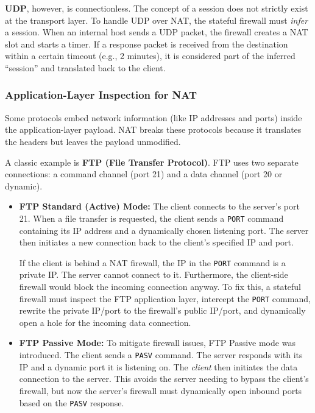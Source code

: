 \textbf{UDP}, however, is connectionless. The concept of a session does not strictly exist at the transport layer. To handle UDP over NAT, the stateful firewall must \textit{infer} a session. When an internal host sends a UDP packet, the firewall creates a NAT slot and starts a timer. If a response packet is received from the destination within a certain timeout (e.g., 2 minutes), it is considered part of the inferred ``session'' and translated back to the client.

\subsubsection{Application-Layer Inspection for NAT}

Some protocols embed network information (like IP addresses and ports) inside the application-layer payload. NAT breaks these protocols because it translates the headers but leaves the payload unmodified.

A classic example is \textbf{FTP (File Transfer Protocol)}. FTP uses two separate connections: a command channel (port 21) and a data channel (port 20 or dynamic).

\begin{itemize}
    \item \textbf{FTP Standard (Active) Mode:} The client connects to the server's port 21. When a file transfer is requested, the client sends a \texttt{PORT} command containing its IP address and a dynamically chosen listening port. The server then initiates a new connection back to the client's specified IP and port. 
    
    If the client is behind a NAT firewall, the IP in the \texttt{PORT} command is a private IP. The server cannot connect to it. Furthermore, the client-side firewall would block the incoming connection anyway. To fix this, a stateful firewall must inspect the FTP application layer, intercept the \texttt{PORT} command, rewrite the private IP/port to the firewall's public IP/port, and dynamically open a hole for the incoming data connection.

    \item \textbf{FTP Passive Mode:} To mitigate firewall issues, FTP Passive mode was introduced. The client sends a \texttt{PASV} command. The server responds with its IP and a dynamic port it is listening on. The \textit{client} then initiates the data connection to the server. This avoids the server needing to bypass the client's firewall, but now the server's firewall must dynamically open inbound ports based on the \texttt{PASV} response.
\end{itemize}

